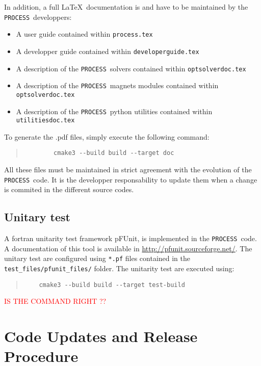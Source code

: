 \documentclass[11pt,a4paper]{report}
\newcommand{\process}{\mbox{\texttt{PROCESS}}}
\begin{document}
In addition, a full \LaTeX\ documentation is and have to be maintained by the \process\ developpers:
\begin{itemize}
	\item A user guide contained within \texttt{process.tex}
	\item A developper guide contained within \texttt{developerguide.tex}
	\item A description of the \process\ solvers contained within \texttt{optsolverdoc.tex}
	\item A description of the \process\ magnets modules contained within \texttt{optsolverdoc.tex}
	\item A description of the \process\ python utilities contained within \texttt{utilitiesdoc.tex}
\end{itemize}

To generate the .pdf files, simply execute the following command:

\begin{quote}
	\begin{verbatim}
		cmake3 --build build --target doc
	\end{verbatim}
\end{quote}

All these files must be maintained in strict agreement with the evolution of the \process\ code. It is the developper responsability to update them when a change is commited in the different source codes.


\subsection{Unitary test}
A fortran unitarity test framework pFUnit, is implemented in the \process\ code. A documentation of this tool is available in \url{http://pfunit.sourceforge.net/}. The unitary test are configured using \texttt{*.pf} files contained in the \texttt{test\_files/pfunit\_files/} folder. The unitarity test are executed using: 

\begin{quote}
	\begin{verbatim}
	cmake3 --build build --target test-build
	\end{verbatim}
\end{quote}
\textcolor{red}{IS THE COMMAND RIGHT ??}


\section{Code Updates and Release Procedure}
\label{sec:code_release}
\end{document}
